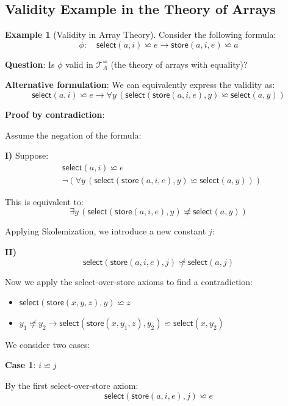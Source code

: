 \documentclass[11pt,a4paper]{article}
\theoremstyle{definition}
\newtheorem{example}{Example}[section]
\theoremstyle{plain}
\theoremstyle{remark}
\begin{document}
\subsection{Validity Example in the Theory of Arrays}

\begin{example}[Validity in Array Theory]
Consider the following formula:
\[
\phi: \quad \textsf{select}(a, i) \backsimeq e \rightarrow \textsf{store}(a, i, e) \backsimeq a
\]

\textbf{Question}: Is $\phi$ valid in $\mathcal{T}_A^{\backsimeq}$ (the theory of arrays with equality)?

\textbf{Alternative formulation}: We can equivalently express the validity as:
\[
\textsf{select}(a, i) \backsimeq e \rightarrow \forall y \, (\textsf{select}(\textsf{store}(a, i, e), y) \backsimeq \textsf{select}(a, y))
\]

\textbf{Proof by contradiction}:

Assume the negation of the formula:

\textbf{I)} Suppose:
\begin{align*}
&\textsf{select}(a, i) \backsimeq e \\
&\neg (\forall y \, (\textsf{select}(\textsf{store}(a, i, e), y) \backsimeq \textsf{select}(a, y)))
\end{align*}

This is equivalent to:
\[
\exists y \, (\textsf{select}(\textsf{store}(a, i, e), y) \not\backsimeq \textsf{select}(a, y))
\]

Applying Skolemization, we introduce a new constant $j$:

\textbf{II)}
\[
\textsf{select}(\textsf{store}(a, i, e), j) \not\backsimeq \textsf{select}(a, j)
\]

Now we apply the select-over-store axioms to find a contradiction:
\begin{itemize}
    \item $\textsf{select}(\textsf{store}(x, y, z), y) \backsimeq z$
    \item $y_1 \not\backsimeq y_2 \rightarrow \textsf{select}(\textsf{store}(x, y_1, z), y_2) \backsimeq \textsf{select}(x, y_2)$
\end{itemize}

We consider two cases:

\textbf{Case 1}: $i \backsimeq j$

By the first select-over-store axiom:
\[
\textsf{select}(\textsf{store}(a, i, e), j) \backsimeq e
\]


\end{example}
\end{document}
